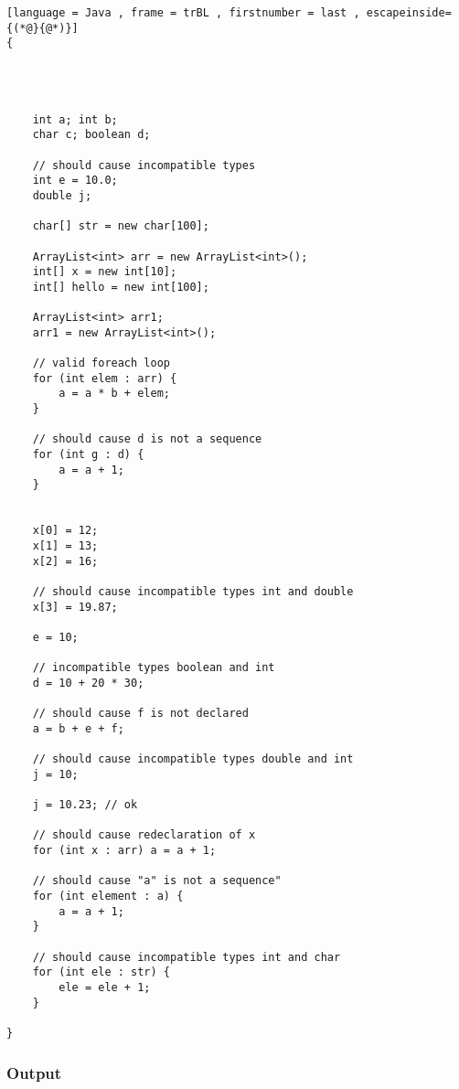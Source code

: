 \documentclass{article}
\begin{document}
\begin{lstlisting}[language = Java , frame = trBL , firstnumber = last , escapeinside={(*@}{@*)}]
{
 
    

    
    int a; int b;
    char c; boolean d;
    
    // should cause incompatible types 
    int e = 10.0;
    double j;
    
    char[] str = new char[100];
    
    ArrayList<int> arr = new ArrayList<int>();
    int[] x = new int[10];
    int[] hello = new int[100];
    
    ArrayList<int> arr1;    
    arr1 = new ArrayList<int>();
    
    // valid foreach loop
    for (int elem : arr) {
        a = a * b + elem;
    }
    
    // should cause d is not a sequence
    for (int g : d) {
        a = a + 1;
    }
    

    x[0] = 12;
    x[1] = 13;
    x[2] = 16;
    
    // should cause incompatible types int and double
    x[3] = 19.87;
    
    e = 10;
    
    // incompatible types boolean and int
    d = 10 + 20 * 30;
    
    // should cause f is not declared
    a = b + e + f;
    
    // should cause incompatible types double and int
    j = 10;
    
    j = 10.23; // ok
    
    // should cause redeclaration of x
    for (int x : arr) a = a + 1;
    
    // should cause "a" is not a sequence"
    for (int element : a) {
        a = a + 1;
    }
    
    // should cause incompatible types int and char
    for (int ele : str) {
        ele = ele + 1;
    }
    
}

\end{lstlisting}

\subsubsection{Output}
\end{document}
